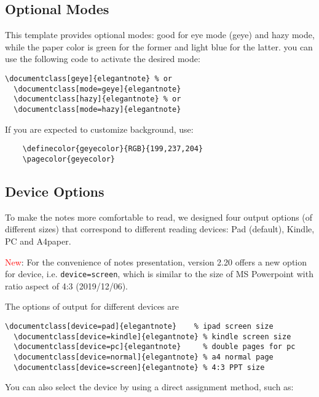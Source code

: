 \documentclass[en,normal,12pt,blue]{elegantnote}
\begin{document}
\subsection{Optional Modes}

This template provides optional modes: good for eye mode (geye) and hazy mode, while the paper color is green for the former and light blue for the latter. you can use the following code to activate the desired mode:
\begin{lstlisting}[frame=none]
  \documentclass[geye]{elegantnote} % or
  \documentclass[mode=geye]{elegantnote}
  \documentclass[hazy]{elegantnote} % or
  \documentclass[mode=hazy]{elegantnote}
\end{lstlisting}

\begin{remark}
  If you are expected to customize background, use:
  \begin{lstlisting}
    \definecolor{geyecolor}{RGB}{199,237,204}
    \pagecolor{geyecolor}
  \end{lstlisting}
\end{remark}


\subsection{Device Options}

To make the notes more comfortable to read, we designed four output options (of different sizes) that correspond to different reading devices: Pad (default), Kindle, PC and A4paper.

\textcolor{red}{New}: For the convenience of notes presentation, version 2.20 offers a new option for device, i.e. \lstinline{device=screen}, which is similar to the size of MS Powerpoint with ratio aspect of 4:3 (2019/12/06).

The options of output for different devices are
\begin{lstlisting}[frame=none]
  \documentclass[device=pad]{elegantnote}    % ipad screen size
  \documentclass[device=kindle]{elegantnote} % kindle screen size
  \documentclass[device=pc]{elegantnote}     % double pages for pc
  \documentclass[device=normal]{elegantnote} % a4 normal page
  \documentclass[device=screen]{elegantnote} % 4:3 PPT size
\end{lstlisting}

\begin{note}
You can also select the device by using a direct assignment method, such as:
\end{note}
\end{document}
